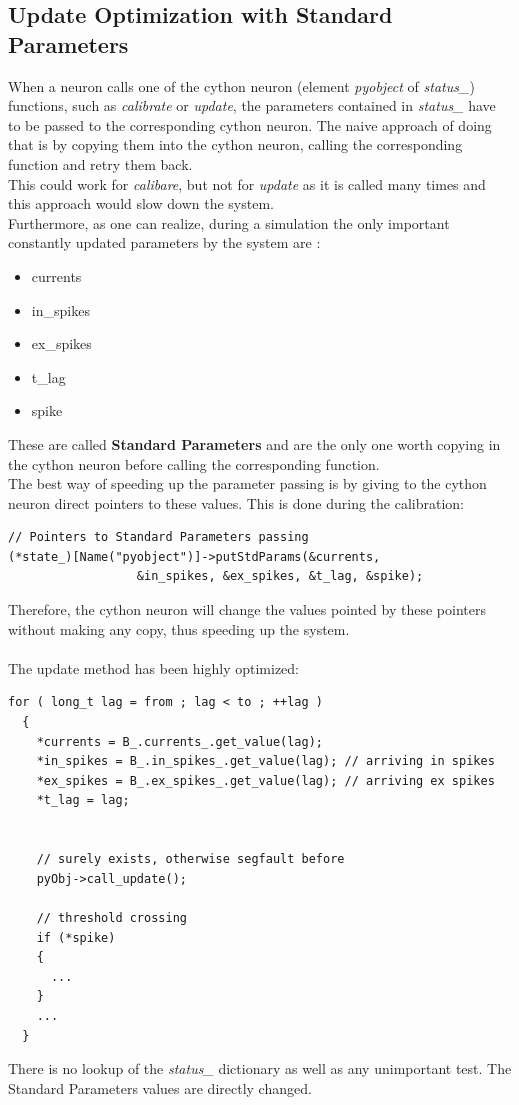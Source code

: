 \documentclass{article}
\begin{document}
\subsection{Update Optimization with Standard Parameters}
When a neuron calls one of the cython neuron (element \emph{pyobject} of \emph{status\_}) functions, such as \emph{calibrate} or \emph{update}, the parameters contained in \emph{status\_} have to be passed to the corresponding cython neuron. The naive approach of doing that is by copying them into the cython neuron, calling the corresponding function and retry them back.\\
This could work for \emph{calibare}, but not for \emph{update} as it is called many times and this approach would slow down the system. \\
Furthermore, as one can realize, during a simulation the only important constantly updated parameters by the system are :\\
\begin{itemize}
\item currents
\item in\_spikes
\item ex\_spikes
\item t\_lag
\item spike
\end{itemize}
These are called \textbf{Standard Parameters} and are the only one worth copying in the cython neuron before calling the corresponding function.\\
The best way of speeding up the parameter passing is by giving to the cython neuron direct pointers to these values. This is done during the calibration:
\begin{verbatim}
// Pointers to Standard Parameters passing
(*state_)[Name("pyobject")]->putStdParams(&currents, 
                  &in_spikes, &ex_spikes, &t_lag, &spike);
\end{verbatim}
Therefore, the cython neuron will change the values pointed by these pointers without making any copy, thus speeding up the system. \\ \\

The update method has been highly optimized:
\begin{verbatim}  
for ( long_t lag = from ; lag < to ; ++lag )
  {
	*currents = B_.currents_.get_value(lag);
    *in_spikes = B_.in_spikes_.get_value(lag); // arriving in spikes
    *ex_spikes = B_.ex_spikes_.get_value(lag); // arriving ex spikes
    *t_lag = lag;


    // surely exists, otherwise segfault before
	pyObj->call_update();

    // threshold crossing
    if (*spike)
    {
      ...
    }
    ...
  }
\end{verbatim}
There is no lookup of the \emph{status\_} dictionary as well as any unimportant test. The Standard Parameters values are directly changed.
\end{document}
